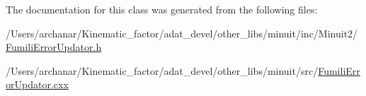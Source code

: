 The documentation for this class was generated from the following files\+:\begin{DoxyCompactItemize}
\item 
/\+Users/archanar/\+Kinematic\+\_\+factor/adat\+\_\+devel/other\+\_\+libs/minuit/inc/\+Minuit2/\mbox{\hyperlink{other__libs_2minuit_2inc_2Minuit2_2FumiliErrorUpdator_8h}{Fumili\+Error\+Updator.\+h}}\item 
/\+Users/archanar/\+Kinematic\+\_\+factor/adat\+\_\+devel/other\+\_\+libs/minuit/src/\mbox{\hyperlink{FumiliErrorUpdator_8cxx}{Fumili\+Error\+Updator.\+cxx}}\end{DoxyCompactItemize}
